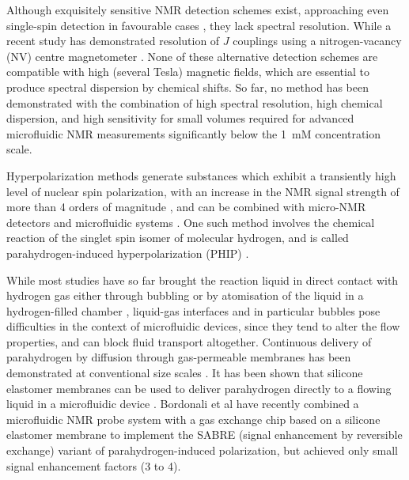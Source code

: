  Although exquisitely sensitive NMR detection schemes exist,
 approaching even single-spin detection in favourable cases
 \cite{Rugar:1992dm,Rugar:2004bc,Mamin:2007ff,Poggio:2010jf,
 Maze:2008cs,Staudacher:2013kn,Rugar:2015by,McDermott:2002hp,
 Budker:2007hz,Xu:2006kg,Blanchard:2013gs}, they lack spectral resolution.
 While a recent study
 has demonstrated resolution of $J$ couplings using a nitrogen-vacancy
 (NV) centre magnetometer \cite{Glenn:2018ct}. None of these
 alternative detection schemes are compatible with high (several Tesla)
 magnetic fields, which are essential to produce spectral dispersion
 by chemical shifts.
 So far, no method has been demonstrated with the combination of high
 spectral resolution, high chemical dispersion,
 and high sensitivity for small volumes required for
 advanced microfluidic NMR measurements significantly
 below the 1~mM concentration scale.

 Hyperpolarization methods generate substances which exhibit a transiently high
 level of nuclear spin polarization, with an increase in the NMR signal strength
 of more than 4 orders of magnitude \cite{munnemann2011nuclear}, and can be combined
 with micro-NMR detectors and microfluidic systems \cite{McDonnell:2005dn,Desvaux:2009bq,Telkki:2010vg,Paciok:2011e,
 JimenezMartinez:2014et,Causier:2015fg,eills-hale2018EuromarPHIP,Bordonali:2019jqa}.
 One such method
 involves the chemical reaction of the singlet spin isomer of molecular
 hydrogen, and is called parahydrogen-induced hyperpolarization (PHIP)
 \cite{hovener2018parahydrogen,duckett2012application,gloggler2013hydrogen,green2012theory}.

 While most studies have so far brought the reaction liquid in direct contact
 with hydrogen gas either through bubbling or by atomisation of the liquid
 in a hydrogen-filled chamber \cite{bhattacharya2007towards,chekmenev2008pasadena,
 chekmenev2009hyperpolarized,shchepin2014parahydrogen,
 Reineri:2015he,cavallari201813,eills2017singlet},
 liquid-gas interfaces and in particular bubbles
 pose difficulties in the context of microfluidic devices, since they tend
 to alter the flow properties, and can block fluid transport altogether.
 Continuous delivery of parahydrogen by diffusion through
 gas-permeable membranes has been demonstrated at
 conventional size scales \cite{Roth:2010hk,Lehmkuhl:2018cd}.
 It has been shown that silicone elastomer membranes can be used
 to deliver parahydrogen directly to a flowing liquid in a microfluidic
 device \cite{eills-hale2018EuromarPHIP}. Bordonali et al \cite{Bordonali:2019jqa} have
 recently combined a microfluidic NMR probe system with a gas exchange
 chip based on a silicone elastomer membrane to implement the SABRE (signal
 enhancement by reversible exchange) variant of parahydrogen-induced polarization,
 but achieved only small signal enhancement factors (3 to 4).


